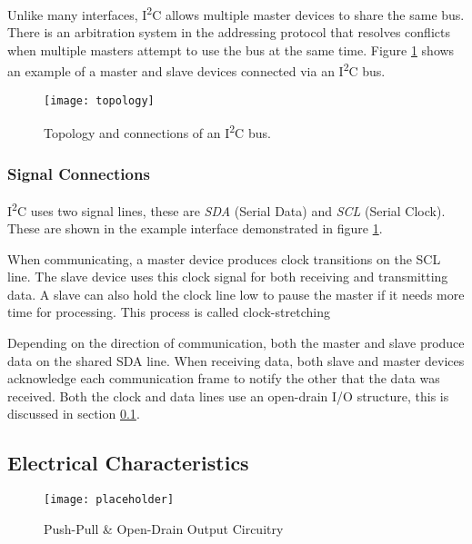 \documentclass[11pt,fleqn]{book} %
\begin{document}
           Unlike many interfaces, I\textsuperscript{2}C allows multiple master devices to share the same bus. There is an arbitration system in the addressing protocol that resolves conflicts when multiple masters attempt to use the bus at the same time. Figure \ref{topology} shows an example of a master and slave devices connected via an I\textsuperscript{2}C bus. 

            \begin{figure}[]
                \centering\texttt{[image: topology]}
                \caption{Topology and connections of an I\textsuperscript{2}C bus.}
                \label{topology}
            \end{figure}
            
        \subsubsection{Signal Connections}
            I\textsuperscript{2}C uses two signal lines, these are \textit{SDA} (Serial Data) and \textit{SCL} (Serial Clock). These are shown in the example interface demonstrated in figure \ref{topology}. 
            
            When communicating, a master device produces clock transitions on the SCL line. The slave device uses this clock signal for both receiving and transmitting data. A slave can also hold the clock line low to pause the master if it needs more time for processing. This process is called clock-stretching
            
            Depending on the direction of communication, both the master and slave produce data on the shared SDA line. When receiving data, both slave and master devices acknowledge each communication frame to notify the other that the data was received.  Both the clock and data lines use an open-drain I/O structure, this is discussed in section \ref{electrical}. 
            
    \subsection{Electrical Characteristics} \label{electrical}
        \begin{figure}[]
            \centering\texttt{[image: placeholder]}
            \caption{Push-Pull \& Open-Drain Output Circuitry}
            \label{output_circuit}
        \end{figure}
        
\end{document}
